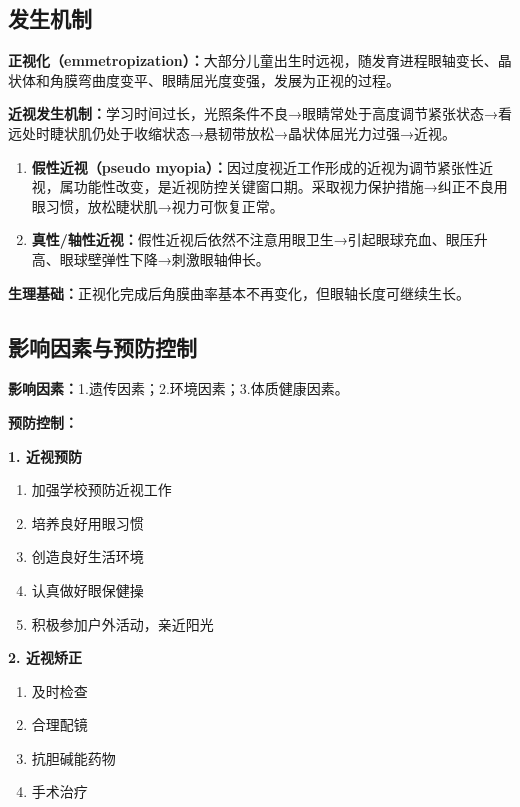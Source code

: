 \subsection{发生机制}

\begin{keybox}
\textbf{正视化（emmetropization）：}大部分儿童出生时远视，随发育进程眼轴变长、晶状体和角膜弯曲度变平、眼睛屈光度变强，发展为正视的过程。

\textbf{近视发生机制：}学习时间过长，光照条件不良→眼睛常处于高度调节紧张状态→看远处时睫状肌仍处于收缩状态→悬韧带放松→晶状体屈光力过强→近视。

\begin{enumerate}[leftmargin=*]
    \item \textbf{假性近视（pseudo myopia）：}因过度视近工作形成的近视为调节紧张性近视，属功能性改变，是近视防控关键窗口期。采取视力保护措施→纠正不良用眼习惯，放松睫状肌→视力可恢复正常。
    \item \textbf{真性/轴性近视：}假性近视后依然不注意用眼卫生→引起眼球充血、眼压升高、眼球壁弹性下降→刺激眼轴伸长。
\end{enumerate}

\textbf{生理基础：}正视化完成后角膜曲率基本不再变化，但眼轴长度可继续生长。
\end{keybox}

\subsection{影响因素与预防控制}

\begin{keybox}
\textbf{影响因素：}1.遗传因素；2.环境因素；3.体质健康因素。

\textbf{预防控制：}

\textbf{1. 近视预防}
\begin{enumerate}[leftmargin=*]
    \item 加强学校预防近视工作
    \item 培养良好用眼习惯
    \item 创造良好生活环境
    \item 认真做好眼保健操
    \item 积极参加户外活动，亲近阳光
\end{enumerate}

\textbf{2. 近视矫正}
\begin{enumerate}[leftmargin=*]
    \item 及时检查
    \item 合理配镜
    \item 抗胆碱能药物
    \item 手术治疗
\end{enumerate}
\end{keybox}

